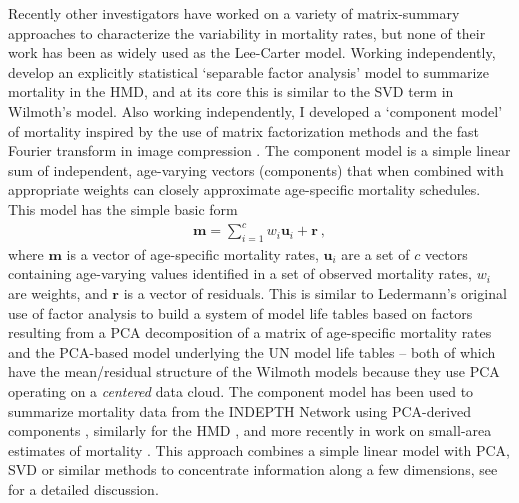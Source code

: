 \documentclass[11pt]{article}
\newcommand{\mbf}{\mathbf}
\begin{document}
Recently other investigators have worked on a variety of matrix-summary approaches to characterize the variability in mortality rates, but none of their work has been as widely used as the Lee-Carter model.  Working independently, \cite{fosdick2012separable} develop an explicitly statistical `separable factor analysis' model to summarize mortality in the HMD, and at its core this is similar to the SVD term in Wilmoth's model.  Also working independently, I developed a `component model' of mortality inspired by the use of matrix factorization methods and the fast Fourier transform in image compression \citep{clarkPhD}.  The component model is a simple linear sum of independent, age-varying vectors (components) that when combined with appropriate weights can closely approximate age-specific mortality schedules.  This model has the simple basic form%
%
\begin{align}
\mbf{m} = \sum_{i=1}^c {w_i \mbf{u}_i} + \mbf{r}\ , 
\label{eq:compMod}
\end{align} %
%
where $\mbf{m}$ is a vector of age-specific mortality rates, $\mbf{u}_i$ are a set of $c$ vectors containing age-varying values identified in a set of observed mortality rates, $w_i$ are weights, and $\mbf{r}$ is a vector of residuals.  This is similar to Ledermann's original use of factor analysis to build a system of model life tables based on factors resulting from a PCA decomposition of a matrix of age-specific mortality rates \citep{ledermannBreas1959,ledermann1969nouvelles} and the PCA-based model underlying the UN model life tables \citep{united1982model} -- both of which have the mean/residual structure of the Wilmoth models because they use PCA operating on a \textit{centered} data cloud. The component model has been used to summarize mortality data from the INDEPTH Network using PCA-derived components \citep{clarkPhD, indepthMLT2002, clark2009IndMltPaa}, similarly for the HMD \citep{clarkSharrow2011, clark2011ContMltPaa}, and more recently in work on small-area estimates of mortality \citep{alexander2016flexible}. This approach combines a simple linear model with PCA, SVD or similar methods to concentrate information along a few dimensions, see \citep{clark2015singular} for a detailed discussion.  
\end{document}
